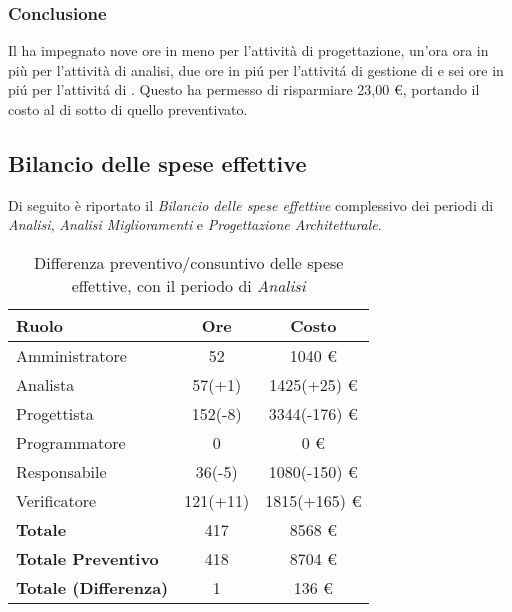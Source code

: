 \subsubsection{Conclusione}
Il  ha impegnato nove ore in meno per l'attivit\`a di progettazione, un'ora ora in più per l'attivit\`a di analisi, due ore in pi\'u per l'attivit\'a di gestione di  e sei ore in pi\'u per l'attivit\'a di . Questo ha permesso di risparmiare 23,00 \euro{}, portando il costo  al di sotto di quello preventivato.

\subsection{Bilancio delle spese effettive}
Di seguito è riportato il \textit{Bilancio delle spese effettive} complessivo dei periodi di \textit{Analisi}, \textit{Analisi Miglioramenti} e \textit{Progettazione Architetturale}.

\begin{table}[H]
	\centering
	\begin{tabular}{ l c c }
		\textbf{Ruolo} & \textbf{Ore} & \textbf{Costo} \\
		\hline
		Amministratore & 52 & 1040 \euro{} \\
		Analista & 57(+1) & 1425(+25) \euro{} \\
		Progettista & 152(-8) & 3344(-176) \euro{} \\
		Programmatore & 0 & 0 \euro{} \\
		Responsabile & 36(-5) & 1080(-150) \euro{} \\
		Verificatore & 121(+11) & 1815(+165) \euro{} \\
		\hline
		\textbf{Totale \glossaryItem{Consuntivo}} & 417 & 8568 \euro{} \\
		\hline
		\textbf{Totale Preventivo} & 418 & 8704 \euro{} \\
		\hline
		\textbf{Totale (Differenza)} & 1 & 136 \euro{} \\
		\hline
	\end{tabular}
	\caption{Differenza preventivo/consuntivo delle spese effettive, con il periodo di \textit{Analisi}}
\end{table}

